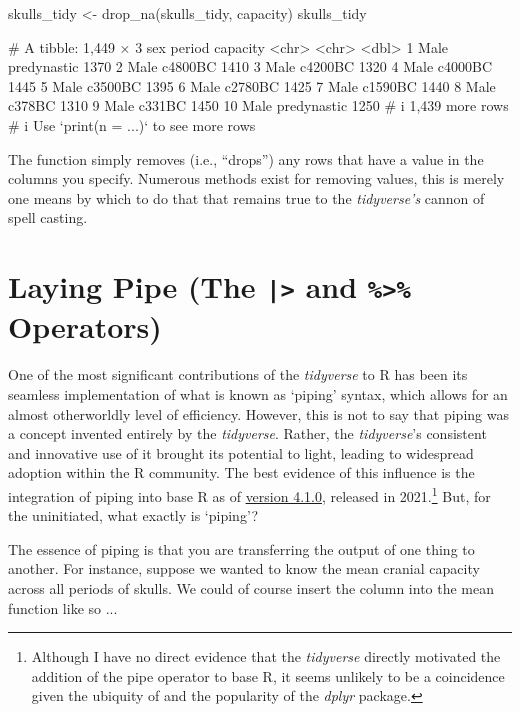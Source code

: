 \begin{inR}
skulls_tidy <- drop_na(skulls_tidy, capacity)
skulls_tidy
\end{inR}
\begin{outR}
# A tibble: 1,449 × 3
   sex   period      capacity
   <chr> <chr>          <dbl>
 1 Male  predynastic     1370
 2 Male  c4800BC         1410
 3 Male  c4200BC         1320
 4 Male  c4000BC         1445
 5 Male  c3500BC         1395
 6 Male  c2780BC         1425
 7 Male  c1590BC         1440
 8 Male  c378BC          1310
 9 Male  c331BC          1450
10 Male  predynastic     1250
# i 1,439 more rows
# i Use `print(n = ...)` to see more rows
\end{outR}

\noindent
The function  simply removes (i.e., ``drops'') any rows that have a  value in the columns you specify. Numerous methods exist for removing  values, this is merely one means by which to do that that remains true to the \textit{tidyverse's} cannon of spell casting.

\section{Laying Pipe (The \texttt{|>} and \texttt{\%>\%} Operators)}

One of the most significant contributions of the \textit{tidyverse} to R has been its seamless implementation of what is known as `piping' syntax, which allows for an almost otherworldly level of efficiency. However, this is not to say that piping was a concept invented entirely by the \textit{tidyverse}. Rather, the \textit{tidyverse}'s consistent and innovative use of it brought its potential to light, leading to widespread adoption within the R community. The best evidence of this influence is the integration of piping into base R as of \href{https://stat.ethz.ch/pipermail/r-announce/2021/000670.html}{version 4.1.0}, released in 2021.\footnote{Although I have no direct evidence that the \textit{tidyverse} directly motivated the addition of the pipe operator to base R, it seems unlikely to be a coincidence given the ubiquity of \R{\%>\%} and the popularity of the \textit{dplyr} package.} But, for the uninitiated, what exactly is `piping'?

The essence of piping is that you are transferring the output of one thing to another. For instance, suppose we wanted to know the mean cranial capacity across all periods of skulls. We could of course insert the  column into the mean function like so ...

